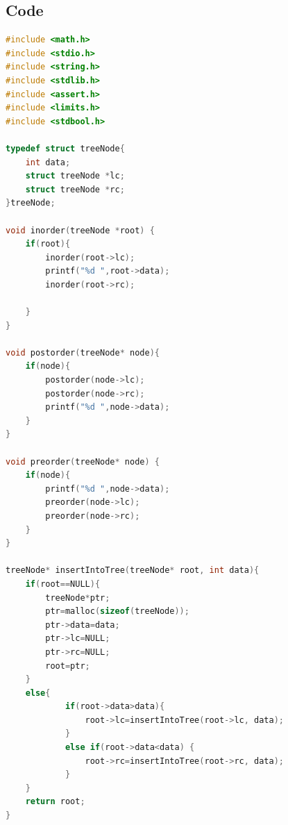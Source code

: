 \documentclass[14pt, letterpaper]{article}
\begin{document}
\subsection{Code}

\begin{lstlisting}[language=C,showstringspaces=false]
#include <math.h>
#include <stdio.h>
#include <string.h>
#include <stdlib.h>
#include <assert.h>
#include <limits.h>
#include <stdbool.h>

typedef struct treeNode{
    int data;
    struct treeNode *lc;
    struct treeNode *rc;
}treeNode;

void inorder(treeNode *root) {
    if(root){
        inorder(root->lc);
        printf("%d ",root->data);
        inorder(root->rc);
        
    }
} 

void postorder(treeNode* node){ 
    if(node){
        postorder(node->lc);
        postorder(node->rc);
        printf("%d ",node->data);
    }
} 

void preorder(treeNode* node) { 
    if(node){
        printf("%d ",node->data);
        preorder(node->lc);
        preorder(node->rc);
    }
} 

treeNode* insertIntoTree(treeNode* root, int data){
    if(root==NULL){
        treeNode*ptr;
        ptr=malloc(sizeof(treeNode));
        ptr->data=data;
        ptr->lc=NULL;
        ptr->rc=NULL;
        root=ptr;
    }
    else{
            if(root->data>data){
                root->lc=insertIntoTree(root->lc, data);
            }
            else if(root->data<data) {
                root->rc=insertIntoTree(root->rc, data);                
            }
    }
    return root;
} 
  

\end{lstlisting}
\end{document}
